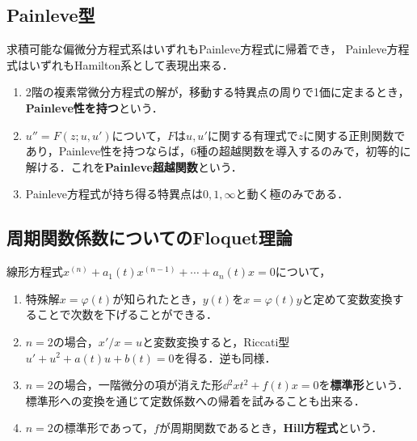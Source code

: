 \documentclass[uplatex,dvipdfmx]{jsreport}
\begin{document}
\subsection{Painleve型}

\begin{tcolorbox}[colframe=ForestGreen, colback=ForestGreen!10!white,breakable,colbacktitle=ForestGreen!40!white,coltitle=black,fonttitle=\bfseries\sffamily,
title=]
    求積可能な偏微分方程式系はいずれもPainleve方程式に帰着でき，
    Painleve方程式はいずれもHamilton系として表現出来る．
\end{tcolorbox}

\begin{definition}\mbox{}
    \begin{enumerate}
        \item 2階の複素常微分方程式の解が，移動する特異点の周りで1価に定まるとき，\textbf{Painleve性を持つ}という．
        \item $u''=F(z;u,u')$について，$F$は$u,u'$に関する有理式で$z$に関する正則関数であり，Painleve性を持つならば，6種の超越関数を導入するのみで，初等的に解ける．これを\textbf{Painleve超越関数}という．
        \item Painleve方程式が持ち得る特異点は$0,1,\infty$と動く極のみである．
    \end{enumerate}
\end{definition}


\subsection{周期関数係数についてのFloquet理論}

\begin{problem}[Hille方程式]
    \begin{example}
        線形方程式$x^{(n)}+a_1(t)x^{(n-1)}+\cdots+a_n(t)x=0$について，
        \begin{enumerate}
            \item 特殊解$x=\varphi(t)$が知られたとき，$y(t)$を$x=\varphi(t)y$と定めて変数変換することで次数を下げることができる．
            \item $n=2$の場合，$x'/x=u$と変数変換すると，Riccati型$u'+u^2+a(t)u+b(t)=0$を得る．逆も同様．
            \item $n=2$の場合，一階微分の項が消えた形$\dd{^2x}{t^2}+f(t)x=0$を\textbf{標準形}という．
            標準形への変換を通じて定数係数への帰着を試みることも出来る．
            \item $n=2$の標準形であって，$f$が周期関数であるとき，\textbf{Hill方程式}という．
        \end{enumerate}
    \end{example}
\end{problem}
\end{document}

